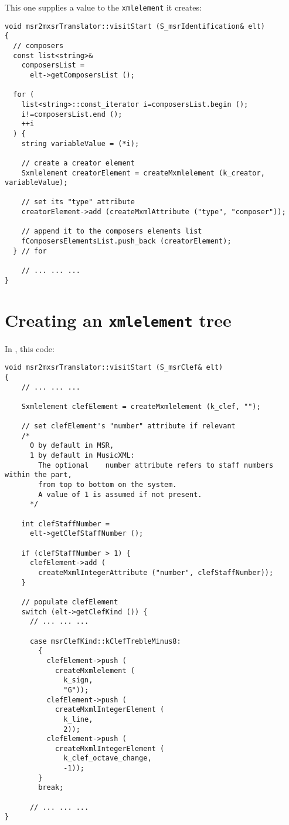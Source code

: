 This one supplies a value to the {\tt xmlelement} it creates:
\begin{lstlisting}[language=CPlusPlus]
void msr2mxsrTranslator::visitStart (S_msrIdentification& elt)
{
  // composers
  const list<string>&
    composersList =
      elt->getComposersList ();

  for (
    list<string>::const_iterator i=composersList.begin ();
    i!=composersList.end ();
    ++i
  ) {
    string variableValue = (*i);

    // create a creator element
    Sxmlelement creatorElement = createMxmlelement (k_creator, variableValue);

    // set its "type" attribute
    creatorElement->add (createMxmlAttribute ("type", "composer"));

    // append it to the composers elements list
    fComposersElementsList.push_back (creatorElement);
  } // for

	// ... ... ...
}
\end{lstlisting}


\section{Creating an {\tt xmlelement} tree}

In {\tt }, this code:
\begin{lstlisting}[language=CPlusPlus]
void msr2mxsrTranslator::visitStart (S_msrClef& elt)
{
    // ... ... ...

    Sxmlelement clefElement = createMxmlelement (k_clef, "");

    // set clefElement's "number" attribute if relevant
    /*
      0 by default in MSR,
      1 by default in MusicXML:
        The optional	number attribute refers to staff numbers within the part,
        from top to bottom on the system.
        A value of 1 is assumed if not present.
	  */

    int clefStaffNumber =
      elt->getClefStaffNumber ();

    if (clefStaffNumber > 1) {
      clefElement->add (
        createMxmlIntegerAttribute ("number", clefStaffNumber));
    }

    // populate clefElement
    switch (elt->getClefKind ()) {
      // ... ... ...

      case msrClefKind::kClefTrebleMinus8:
        {
          clefElement->push (
            createMxmlelement (
              k_sign,
              "G"));
          clefElement->push (
            createMxmlIntegerElement (
              k_line,
              2));
          clefElement->push (
            createMxmlIntegerElement (
              k_clef_octave_change,
              -1));
        }
        break;

      // ... ... ...
}
\end{lstlisting}

